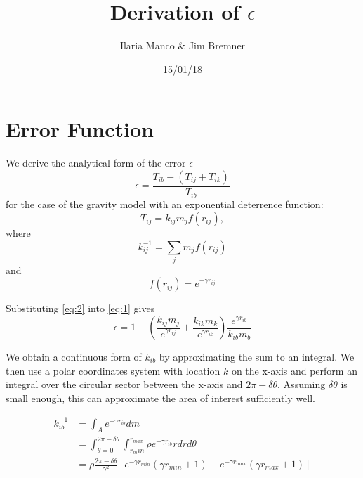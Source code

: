 \documentclass{article}
\title{Derivation of $\epsilon$}
\author{Ilaria Manco \& Jim Bremner}
\date{15/01/18} %
\begin{document}
\maketitle

\section{Error Function}
We derive the analytical form of the error $\epsilon$ 
\begin{equation}\label{eq:1}
\epsilon =  \frac{T_{ib} - (T_{ij} + T_{ik})}{T_{ib}}
\end{equation}
for the case of the gravity model with an exponential deterrence function:
\begin{equation}\label{eq:2}
T_{ij} = k_{ij} m_j f(r_{ij}),
\end{equation}
where 
\begin{equation}\label{eq:3}
k_{ij}^{-1} = \sum_j{m_j f(r_{ij})}
\end{equation}
and
\begin{equation}\label{eq:4}
f(r_{ij}) = e^{-\gamma r_{ij}}
\end{equation}

Substituting \eqref{eq:2} into \eqref{eq:1} gives
\begin{equation}\label{eq:5}
\epsilon = 1 - \left( \frac{k_{ij} m_j}{e^{\gamma r_{ij}}} + \frac{k_{ik} m_k }{e^{\gamma r_{ik}}} \right) \frac{e^{\gamma r_{ib}}}{k_{ib} m_b}
\end{equation}

We obtain a continuous form of $k_{ib}$ by approximating the sum to an integral. We then use a polar coordinates system with location $k$ on the x-axis and perform an integral over the circular sector between the x-axis and $2\pi - \delta \theta$. Assuming $\delta \theta$ is small enough, this can approximate the area of interest sufficiently well.

\begin{equation}\label{eq:6}
\begin{aligned}
k_{ib}^{-1} &= \int_{A}{e^{-\gamma r_{ib}} dm} \\
& = \int_{\theta = 0}^{2\pi - \delta \theta} \int_{r_min}^{r_{max}}{\rho e^{-\gamma r_{ib}} r dr d\theta} \\
& = \rho \frac{2\pi - \delta \theta}{\gamma^2} \left[e^{-\gamma r_{min}} \left( \gamma r_{min} +1 \right) - e^{-\gamma r_{max}} \left( \gamma r_{max} +1 \right) \right]
\end{aligned}
\end{equation}
\end{document}
